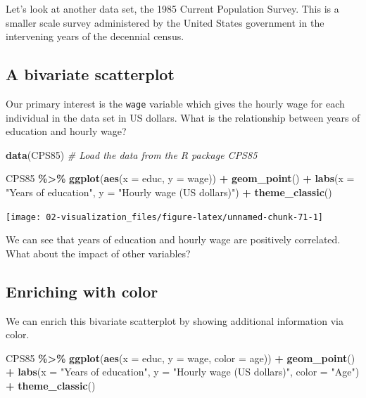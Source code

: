 \documentclass[
]{book}
\newenvironment{Shaded}{\begin{snugshade}}{\end{snugshade}}
\newcommand{\AttributeTok}[1]{\textcolor[rgb]{0.13,0.29,0.53}{#1}}
\newcommand{\CommentTok}[1]{\textcolor[rgb]{0.56,0.35,0.01}{\textit{#1}}}
\newcommand{\FunctionTok}[1]{\textcolor[rgb]{0.13,0.29,0.53}{\textbf{#1}}}
\newcommand{\NormalTok}[1]{#1}
\newcommand{\SpecialCharTok}[1]{\textcolor[rgb]{0.81,0.36,0.00}{\textbf{#1}}}
\newcommand{\StringTok}[1]{\textcolor[rgb]{0.31,0.60,0.02}{#1}}
\begin{document}
Let's look at another data set, the 1985 Current Population Survey. This is a smaller scale survey administered by the United States government in the intervening years of the decennial census.

\subsection{A bivariate scatterplot}\label{a-bivariate-scatterplot}

Our primary interest is the \texttt{wage} variable which gives the hourly wage for each individual in the data set in US dollars. What is the relationship between years of education and hourly wage?

\begin{Shaded}
\begin{Highlighting}[]
\FunctionTok{data}\NormalTok{(CPS85) }\CommentTok{\# Load the data from the R package CPS85}

\NormalTok{CPS85 }\SpecialCharTok{\%\textgreater{}\%}
    \FunctionTok{ggplot}\NormalTok{(}\FunctionTok{aes}\NormalTok{(}\AttributeTok{x =}\NormalTok{ educ, }\AttributeTok{y =}\NormalTok{ wage)) }\SpecialCharTok{+}
    \FunctionTok{geom\_point}\NormalTok{() }\SpecialCharTok{+}
    \FunctionTok{labs}\NormalTok{(}\AttributeTok{x =} \StringTok{"Years of education"}\NormalTok{, }\AttributeTok{y =} \StringTok{"Hourly wage (US dollars)"}\NormalTok{) }\SpecialCharTok{+}
    \FunctionTok{theme\_classic}\NormalTok{()}
\end{Highlighting}
\end{Shaded}

\begin{center}\texttt{[image: 02-visualization\_files/figure-latex/unnamed-chunk-71-1]} \end{center}

We can see that years of education and hourly wage are positively correlated. What about the impact of other variables?

\subsection{Enriching with color}\label{enriching-with-color}

We can enrich this bivariate scatterplot by showing additional information via color.

\begin{Shaded}
\begin{Highlighting}[]
\NormalTok{CPS85 }\SpecialCharTok{\%\textgreater{}\%}
    \FunctionTok{ggplot}\NormalTok{(}\FunctionTok{aes}\NormalTok{(}\AttributeTok{x =}\NormalTok{ educ, }\AttributeTok{y =}\NormalTok{ wage, }\AttributeTok{color =}\NormalTok{ age)) }\SpecialCharTok{+}
    \FunctionTok{geom\_point}\NormalTok{() }\SpecialCharTok{+}
    \FunctionTok{labs}\NormalTok{(}\AttributeTok{x =} \StringTok{"Years of education"}\NormalTok{, }\AttributeTok{y =} \StringTok{"Hourly wage (US dollars)"}\NormalTok{, }\AttributeTok{color =} \StringTok{"Age"}\NormalTok{) }\SpecialCharTok{+}
    \FunctionTok{theme\_classic}\NormalTok{()}
\end{Highlighting}
\end{Shaded}
\end{document}
